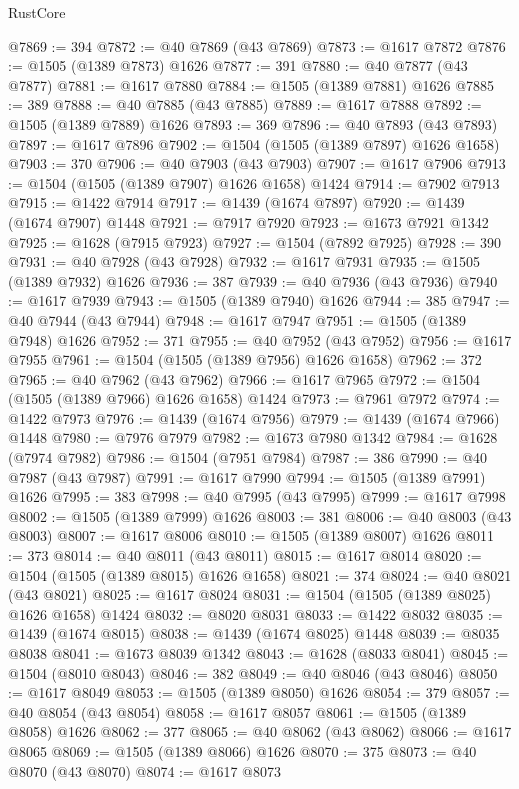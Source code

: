 \begin{lexlean}{RustCore}
\begin{coremodule}
@7869 := 394
@7872 := @40 @7869 (@43 @7869)
@7873 := @1617 @7872
@7876 := @1505 (@1389 @7873) @1626
@7877 := 391
@7880 := @40 @7877 (@43 @7877)
@7881 := @1617 @7880
@7884 := @1505 (@1389 @7881) @1626
@7885 := 389
@7888 := @40 @7885 (@43 @7885)
@7889 := @1617 @7888
@7892 := @1505 (@1389 @7889) @1626
@7893 := 369
@7896 := @40 @7893 (@43 @7893)
@7897 := @1617 @7896
@7902 := @1504 (@1505 (@1389 @7897) @1626 @1658)
@7903 := 370
@7906 := @40 @7903 (@43 @7903)
@7907 := @1617 @7906
@7913 := @1504 (@1505 (@1389 @7907) @1626 @1658) @1424
@7914 := @7902 @7913
@7915 := @1422 @7914
@7917 := @1439 (@1674 @7897)
@7920 := @1439 (@1674 @7907) @1448
@7921 := @7917 @7920
@7923 := @1673 @7921 @1342
@7925 := @1628 (@7915 @7923)
@7927 := @1504 (@7892 @7925)
@7928 := 390
@7931 := @40 @7928 (@43 @7928)
@7932 := @1617 @7931
@7935 := @1505 (@1389 @7932) @1626
@7936 := 387
@7939 := @40 @7936 (@43 @7936)
@7940 := @1617 @7939
@7943 := @1505 (@1389 @7940) @1626
@7944 := 385
@7947 := @40 @7944 (@43 @7944)
@7948 := @1617 @7947
@7951 := @1505 (@1389 @7948) @1626
@7952 := 371
@7955 := @40 @7952 (@43 @7952)
@7956 := @1617 @7955
@7961 := @1504 (@1505 (@1389 @7956) @1626 @1658)
@7962 := 372
@7965 := @40 @7962 (@43 @7962)
@7966 := @1617 @7965
@7972 := @1504 (@1505 (@1389 @7966) @1626 @1658) @1424
@7973 := @7961 @7972
@7974 := @1422 @7973
@7976 := @1439 (@1674 @7956)
@7979 := @1439 (@1674 @7966) @1448
@7980 := @7976 @7979
@7982 := @1673 @7980 @1342
@7984 := @1628 (@7974 @7982)
@7986 := @1504 (@7951 @7984)
@7987 := 386
@7990 := @40 @7987 (@43 @7987)
@7991 := @1617 @7990
@7994 := @1505 (@1389 @7991) @1626
@7995 := 383
@7998 := @40 @7995 (@43 @7995)
@7999 := @1617 @7998
@8002 := @1505 (@1389 @7999) @1626
@8003 := 381
@8006 := @40 @8003 (@43 @8003)
@8007 := @1617 @8006
@8010 := @1505 (@1389 @8007) @1626
@8011 := 373
@8014 := @40 @8011 (@43 @8011)
@8015 := @1617 @8014
@8020 := @1504 (@1505 (@1389 @8015) @1626 @1658)
@8021 := 374
@8024 := @40 @8021 (@43 @8021)
@8025 := @1617 @8024
@8031 := @1504 (@1505 (@1389 @8025) @1626 @1658) @1424
@8032 := @8020 @8031
@8033 := @1422 @8032
@8035 := @1439 (@1674 @8015)
@8038 := @1439 (@1674 @8025) @1448
@8039 := @8035 @8038
@8041 := @1673 @8039 @1342
@8043 := @1628 (@8033 @8041)
@8045 := @1504 (@8010 @8043)
@8046 := 382
@8049 := @40 @8046 (@43 @8046)
@8050 := @1617 @8049
@8053 := @1505 (@1389 @8050) @1626
@8054 := 379
@8057 := @40 @8054 (@43 @8054)
@8058 := @1617 @8057
@8061 := @1505 (@1389 @8058) @1626
@8062 := 377
@8065 := @40 @8062 (@43 @8062)
@8066 := @1617 @8065
@8069 := @1505 (@1389 @8066) @1626
@8070 := 375
@8073 := @40 @8070 (@43 @8070)
@8074 := @1617 @8073

\end{coremodule}
\end{lexlean}
